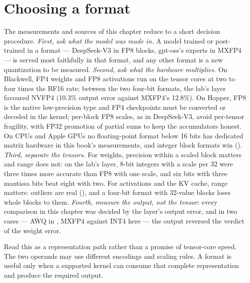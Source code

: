 \section{Choosing a format}

The measurements and sources of this chapter reduce to a short decision
procedure. \emph{First, ask what the model was made in.} A model trained or
post-trained in a format --- DeepSeek-V3 in FP8 blocks, gpt-oss's experts in
MXFP4 --- is served most faithfully in that format, and any other format is a
new quantization to be measured. \emph{Second, ask what the hardware multiplies.}
On Blackwell, FP4 weights and FP8 activations run on the tensor cores at two to
four times the BF16 rate; between the two four-bit formats, the lab's layer
favoured NVFP4 (10.3\% output error against MXFP4's 12.8\%). On Hopper, FP8 is
the native low-precision type and FP4 checkpoints must be converted or decoded
in the kernel; per-block FP8 scales, as in DeepSeek-V3, avoid per-tensor
fragility, with FP32 promotion of partial sums to keep the accumulators honest.
On CPUs and Apple GPUs no floating-point format below 16 bits has dedicated
matrix hardware in this book's measurements, and integer block formats win
(). \emph{Third, separate the tensors.} For weights,
precision within a scaled block matters and range does not: on the lab's layer,
8-bit integers with a scale per 32 were three times more accurate than FP8 with
one scale, and six bits with three mantissa bits beat eight with two. For
activations and the KV cache, range matters: outliers are real
(), and a four-bit format with 32-value blocks loses
whole blocks to them. \emph{Fourth, measure the output, not the tensor}: every
comparison in this chapter was decided by the layer's output error, and in two
cases --- AWQ in , MXFP4 against INT4 here --- the
output reversed the verdict of the weight error.

Read this as a representation path rather than a promise of tensor-core speed. The two operands may use different encodings and scaling rules. A format is useful only when a supported kernel can consume that complete representation and produce the required output.


